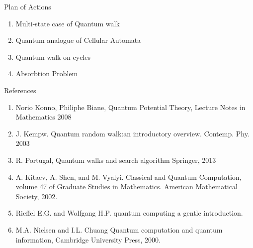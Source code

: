 \documentclass[xcolor=svgnames]{beamer}
\begin{document}
\begin{frame}{Plan of Actions}
\begin{enumerate}
    \item Multi-state case of Quantum walk
    \item Quantum analogue of Cellular Automata
    \item Quantum walk on cycles
    \item Absorbtion Problem
\end{enumerate}
    
\end{frame}

\begin{frame}{References}
\begin{enumerate}
 \item Norio Konno, Philiphe Biane, Quantum Potential Theory, Lecture Notes in Mathematics 2008
 \item J. Kempw. Quantum random walk:an introductory overview. Contemp. Phy. 2003
\item R. Portugal, Quantum walks and search algorithm Springer, 2013
\item A. Kitaev, A. Shen, and M. Vyalyi. Classical and Quantum Computation, volume 47 of Graduate Studies in Mathematics. American Mathematical Society, 2002.
\item Rieffel E.G. and Wolfgang H.P. quantum computing a gentle introduction.
\item M.A. Nielsen and I.L. Chuang Quantum computation and quantum information, Cambridge University Press, 2000.
\end{enumerate}
    
\end{frame}
\end{document}
